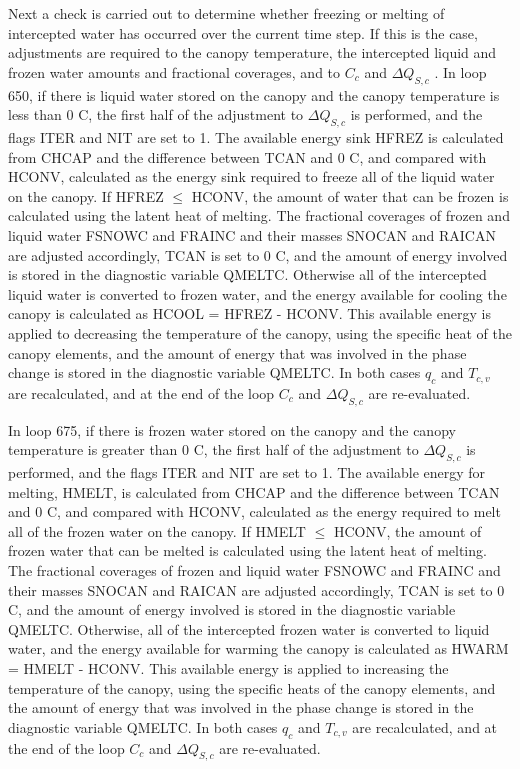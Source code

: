Next a check is carried out to determine whether freezing or melting of intercepted water has occurred over the current time step. If this is the case, adjustments are required to the canopy temperature, the intercepted liquid and frozen water amounts and fractional coverages, and to $C_c$ and $\Delta Q_{S,c}$ . In loop 650, if there is liquid water stored on the canopy and the canopy temperature is less than 0 C, the first half of the adjustment to $\Delta Q_{S,c}$ is performed, and the flags I\+T\+E\+R and N\+I\+T are set to 1. The available energy sink H\+F\+R\+E\+Z is calculated from C\+H\+C\+A\+P and the difference between T\+C\+A\+N and 0 C, and compared with H\+C\+O\+N\+V, calculated as the energy sink required to freeze all of the liquid water on the canopy. If H\+F\+R\+E\+Z $\leq$ H\+C\+O\+N\+V, the amount of water that can be frozen is calculated using the latent heat of melting. The fractional coverages of frozen and liquid water F\+S\+N\+O\+W\+C and F\+R\+A\+I\+N\+C and their masses S\+N\+O\+C\+A\+N and R\+A\+I\+C\+A\+N are adjusted accordingly, T\+C\+A\+N is set to 0 C, and the amount of energy involved is stored in the diagnostic variable Q\+M\+E\+L\+T\+C. Otherwise all of the intercepted liquid water is converted to frozen water, and the energy available for cooling the canopy is calculated as H\+C\+O\+O\+L = H\+F\+R\+E\+Z -\/ H\+C\+O\+N\+V. This available energy is applied to decreasing the temperature of the canopy, using the specific heat of the canopy elements, and the amount of energy that was involved in the phase change is stored in the diagnostic variable Q\+M\+E\+L\+T\+C. In both cases $q_c$ and $T_{c,v}$ are recalculated, and at the end of the loop $C_c$ and $\Delta Q_{S,c}$ are re-\/evaluated.

In loop 675, if there is frozen water stored on the canopy and the canopy temperature is greater than 0 C, the first half of the adjustment to $\Delta Q_{S,c}$ is performed, and the flags I\+T\+E\+R and N\+I\+T are set to 1. The available energy for melting, H\+M\+E\+L\+T, is calculated from C\+H\+C\+A\+P and the difference between T\+C\+A\+N and 0 C, and compared with H\+C\+O\+N\+V, calculated as the energy required to melt all of the frozen water on the canopy. If H\+M\+E\+L\+T $\leq$ H\+C\+O\+N\+V, the amount of frozen water that can be melted is calculated using the latent heat of melting. The fractional coverages of frozen and liquid water F\+S\+N\+O\+W\+C and F\+R\+A\+I\+N\+C and their masses S\+N\+O\+C\+A\+N and R\+A\+I\+C\+A\+N are adjusted accordingly, T\+C\+A\+N is set to 0 C, and the amount of energy involved is stored in the diagnostic variable Q\+M\+E\+L\+T\+C. Otherwise, all of the intercepted frozen water is converted to liquid water, and the energy available for warming the canopy is calculated as H\+W\+A\+R\+M = H\+M\+E\+L\+T -\/ H\+C\+O\+N\+V. This available energy is applied to increasing the temperature of the canopy, using the specific heats of the canopy elements, and the amount of energy that was involved in the phase change is stored in the diagnostic variable Q\+M\+E\+L\+T\+C. In both cases $q_c$ and $T_{c,v}$ are recalculated, and at the end of the loop $C_c$ and $\Delta Q_{S,c}$ are re-\/evaluated.

